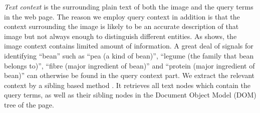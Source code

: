 {\em Text context} is the surrounding plain text of both the image
and the query terms in the web page.
The reason we employ query context in addition is that the context
surrounding the image is likely
to be an accurate description of that image but not always enough to
distinguish different entities.
As  shows, the image context contains limited amount
of information. A great deal of signals for identifying ``bean''
such as ``pea (a kind of bean)'',
``legume (the family that bean belongs to)'',
``fibre (major ingredient of bean)'' and
``protein (major ingredient of bean)''
can otherwise be found in the query context part.
We extract the relevant context by a sibling based method
\cite{Alcic2010}. It retrieves all text nodes which contain
the query terms, as well as their sibling nodes in the
Document Object Model (DOM) tree of the page.

